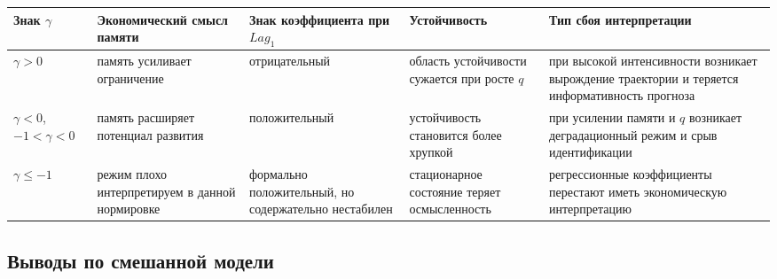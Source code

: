 {\def\LTcaptype{none} %
\begin{longtable}[]{@{}
  >{\raggedright\arraybackslash}p{}
  >{\raggedright\arraybackslash}p{}
  >{\raggedright\arraybackslash}p{}
  >{\raggedright\arraybackslash}p{}
  >{\raggedright\arraybackslash}p{}@{}}
\toprule\noalign{}
\begin{minipage}[b]{\linewidth}\raggedright
Знак \(\gamma\)
\end{minipage} & \begin{minipage}[b]{\linewidth}\raggedright
Экономический смысл памяти
\end{minipage} & \begin{minipage}[b]{\linewidth}\raggedright
Знак коэффициента при \(Lag_1\)
\end{minipage} & \begin{minipage}[b]{\linewidth}\raggedright
Устойчивость
\end{minipage} & \begin{minipage}[b]{\linewidth}\raggedright
Тип сбоя интерпретации
\end{minipage} \\
\midrule\noalign{}
\endhead
\bottomrule\noalign{}
\endlastfoot
\(\gamma>0\) & память усиливает ограничение & отрицательный & область устойчивости сужается при росте \(q\) & при высокой интенсивности возникает вырождение траектории и теряется информативность прогноза \\
\(\gamma<0\), \(-1<\gamma<0\) & память расширяет потенциал развития & положительный & устойчивость становится более хрупкой & при усилении памяти и \(q\) возникает деградационный режим и срыв идентификации \\
\(\gamma\le -1\) & режим плохо интерпретируем в данной нормировке & формально положительный, но содержательно нестабилен & стационарное состояние теряет осмысленность & регрессионные коэффициенты перестают иметь экономическую интерпретацию \\
\end{longtable}
}

\subsection*{Выводы по смешанной модели}
\label{sec:vyvody-po-smeshannoi-modeli}

